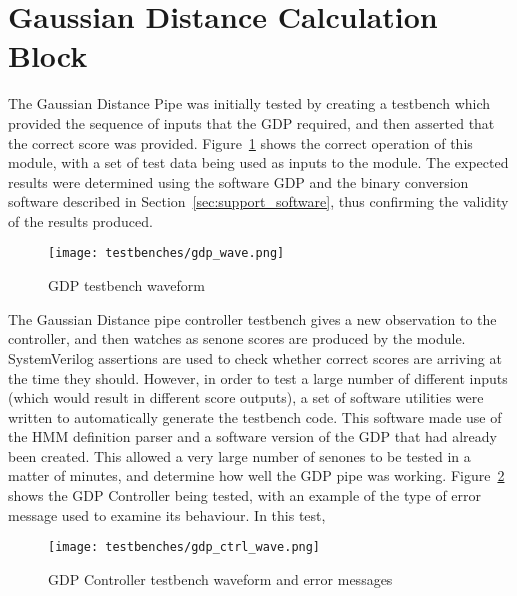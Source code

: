 \section{Gaussian Distance Calculation Block} %
\label{sec:gaussian_distance_calculation_testing}
	The Gaussian Distance Pipe was initially tested by creating a testbench which provided the sequence of inputs that the GDP required, and then asserted that the correct score was provided.  Figure~\ref{fig:test_gdp} shows the correct operation of this module, with a set of test data being used as inputs to the module.  The expected results were determined using the software GDP and the binary conversion software described in Section~\ref{sec:support_software}, thus confirming the validity of the results produced.

	\begin{figure}[tb]
		\begin{center}
			\texttt{[image: testbenches/gdp\_wave.png]}
		\end{center}
		\caption{GDP testbench waveform}
		\label{fig:test_gdp}
	\end{figure}
	
	The Gaussian Distance pipe controller testbench gives a new observation to the controller, and then watches as senone scores are produced by the module.  SystemVerilog assertions are used to check whether correct scores are arriving at the time they should.  However, in order to test a large number of different inputs (which would result in different score outputs), a set of software utilities were written to automatically generate the testbench code.  This software made use of the HMM definition parser and a software version of the GDP that had already been created.  This allowed a very large number of senones to be tested in a matter of minutes, and determine how well the GDP pipe was working.  Figure~\ref{fig:test_gdp_ctrl} shows the GDP Controller being tested, with an example of the type of error message used to examine its behaviour.  In this test, %

	\begin{figure}[tb]
		\begin{center}
			\texttt{[image: testbenches/gdp\_ctrl\_wave.png]}
		\end{center}
		\caption{GDP Controller testbench waveform and error messages}
		\label{fig:test_gdp_ctrl}
	\end{figure}

